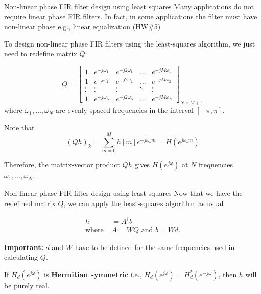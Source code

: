\documentclass[10pt, handout]{beamer}
\begin{document}
%
\begin{frame}{Non-linear phase FIR filter design using least squares}
	Many applications do not require linear phase FIR filters. In fact, in some applications the filter must have non-linear phase e.g., linear equalization (HW\#5)
	
	To design non-linear phase FIR filters using the least-squares algorithm, we just need to redefine matrix $Q$: 
	
	\begin{equation*}
		Q = \begin{bmatrix}
		1 & e^{-j\omega_1} & e^{-j2\omega_1} & \ldots & e^{-jM\omega_1} \\
		1 & e^{-j\omega_2} & e^{-j2\omega_2} & \ldots & e^{-jM\omega_2} \\
		\vdots & \vdots &  \vdots & \ddots & \vdots \\
		1 & e^{-j\omega_N} & e^{-j2\omega_N} & \ldots & e^{-jM\omega_N}
		\end{bmatrix}_{N\times M+1}
	\end{equation*}
	where $\omega_1, \ldots, \omega_N$ are evenly spaced frequencies in the interval $[-\pi, \pi]$.
	
	Note that
	\begin{equation*}
		(Qh)_k = \sum_{m = 0}^{M}h[m]e^{-j\omega_km} = H(e^{j\omega_km}) \tag{the DTFT of $h[m]$ at frequency $\omega_k$}
	\end{equation*}	
	
	Therefore, the matrix-vector product $Qh$ gives $H(e^{j\omega})$ at $N$ frequencies $\omega_1, \ldots, \omega_N$.
\end{frame}

%
\begin{frame}{Non-linear phase FIR filter design using least squares}
Now that we have the redefined matrix $Q$, we can apply the least-squares algorithm as usual

\begin{align*}
	h &= A^{\dagger}b \tag{least squares solution} \\
	\text{where } & A = WQ \text{ and } b = Wd. 
\end{align*}

\textbf{Important:} $d$ and $W$ have to be defined for the same frequencies used in calculating $Q$.

If $H_d(e^{j\omega})$ is \textbf{Hermitian symmetric} i.e., $H_d(e^{j\omega}) = H_d^*(e^{-j\omega})$, then $h$ will be purely real.

\end{frame}
\end{document}

